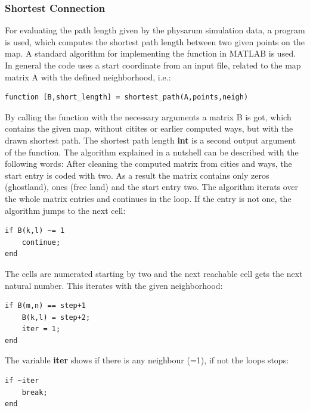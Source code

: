 \documentclass[11pt]{scrartcl}
\begin{document}
\subsubsection{Shortest Connection}
\label{sec:shortest_connection}
For evaluating the path length given by the physarum simulation data, a program is used, which computes the shortest path length between two given points on the map. A standard algorithm \cite{gaertner2010} for implementing the function in MATLAB is used. In general the code uses a start coordinate from an input file, related to the map matrix A with the defined neighborhood, i.e.:

\begin{lstlisting}
function [B,short_length] = shortest_path(A,points,neigh)
\end{lstlisting}

\null

By calling the function with the necessary arguments a matrix B is got, which contains the given map, without citites or earlier computed ways, but with the drawn shortest path. The shortest path length \textbf{int} is a second output argument of the function. The algorithm explained in a nutshell can be described with the following words: After cleaning the computed matrix from cities and ways, the start entry is coded with two. As a result the matrix contains only zeros (ghostland), ones (free land) and the start entry two. The algorithm iterats over the whole matrix entries and continues in the loop. If the entry is not one, the algorithm jumps to the next cell:

\begin{lstlisting}
if B(k,l) ~= 1
	continue;
end
\end{lstlisting}

\null

The cells are numerated starting by two and the next reachable cell gets the next natural number. This iterates with the given neighborhood:

\begin{lstlisting}
if B(m,n) == step+1
	B(k,l) = step+2;
	iter = 1;
end
\end{lstlisting}

\null

The variable \textbf{iter} shows if there is any neighbour (=1), if not the loops stops:

\begin{lstlisting}
if ~iter
	break;
end
\end{lstlisting}
\end{document}
